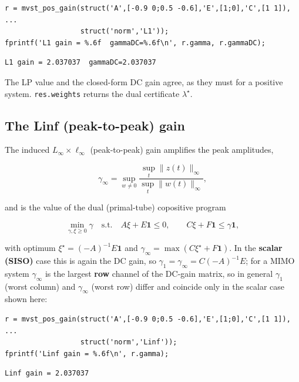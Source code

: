 \documentclass[11pt,oneside]{report}
\newcommand{\code}[1]{\texttt{#1}}
\begin{document}
\begin{lstlisting}[style=matlabstyle]
r = mvst_pos_gain(struct('A',[-0.9 0;0.5 -0.6],'E',[1;0],'C',[1 1]), ...
                  struct('norm','L1'));
fprintf('L1 gain = %.6f  gammaDC=%.6f\n', r.gamma, r.gammaDC);
\end{lstlisting}

\begin{lstlisting}[style=outputstyle]
L1 gain = 2.037037  gammaDC=2.037037
\end{lstlisting}

The LP value and the closed-form DC gain agree, as they must for a positive
system. \code{res.weights} returns the dual certificate \(\lambda^\star\).

\hypertarget{the-linf-peak-to-peak-gain}{%
\subsection{The Linf (peak-to-peak) gain}\label{the-linf-peak-to-peak-gain}}

The induced \(L_\infty \times \ell_\infty\) (peak-to-peak) gain amplifies the
peak amplitudes,

\[
\gamma_\infty
= \sup_{w \ne 0}
\frac{\sup_t \|z(t)\|_\infty}{\sup_t \|w(t)\|_\infty},
\]

and is the value of the dual (primal-tube) copositive program

\[
\min_{\gamma, \xi \ge 0} \gamma
\quad\text{s.t.}\quad
A \xi + E \mathbf{1} \le 0,
\qquad
C \xi + F \mathbf{1} \le \gamma \mathbf{1},
\]

with optimum \(\xi^\star = (-A)^{-1} E \mathbf{1}\) and
\(\gamma_\infty = \max(C \xi^\star + F \mathbf{1})\). In the \textbf{scalar (SISO)} case
this is again the DC gain, so \(\gamma_1 = \gamma_\infty = C(-A)^{-1}E\); for a
MIMO system \(\gamma_\infty\) is the largest \textbf{row} channel of the DC-gain matrix,
so in general \(\gamma_1\) (worst column) and \(\gamma_\infty\) (worst row) differ
and coincide only in the scalar case shown here:

\begin{lstlisting}[style=matlabstyle]
r = mvst_pos_gain(struct('A',[-0.9 0;0.5 -0.6],'E',[1;0],'C',[1 1]), ...
                  struct('norm','Linf'));
fprintf('Linf gain = %.6f\n', r.gamma);
\end{lstlisting}

\begin{lstlisting}[style=outputstyle]
Linf gain = 2.037037
\end{lstlisting}
\end{document}
